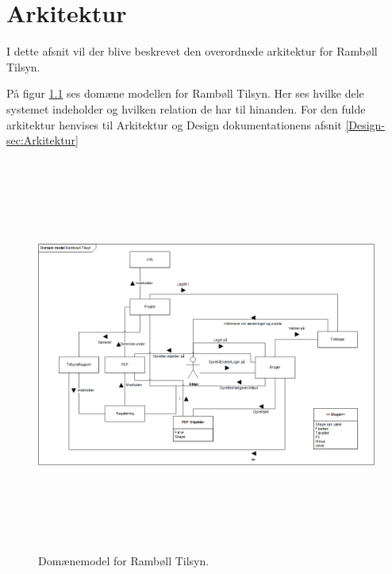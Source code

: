 \chapter{Arkitektur}
I dette afsnit vil der blive beskrevet den overordnede arkitektur for Rambøll Tilsyn.

På figur \ref{fig:Domain} ses domæne modellen for Rambøll Tilsyn. Her ses hvilke dele systemet indeholder og hvilken relation de har til hinanden.
For den fulde arkitektur henvises til Arkitektur og Design dokumentationens afsnit \ref{Design-sec:Arkitektur}

\begin{figure}[H] %
	\centering
	\includegraphics[height=13cm, width=17cm]{Arkitektur/Domainmodel}
	\caption{Domænemodel for Rambøll Tilsyn.}
	\label{fig:Domain}
\end{figure}

